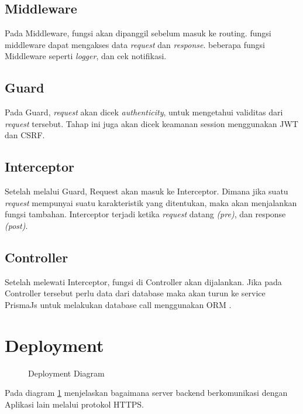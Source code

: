 \subsection{Middleware}
Pada Middleware, fungsi akan dipanggil sebelum masuk ke routing. fungsi middleware dapat mengakses data \textit{request} dan \textit{response}. beberapa fungsi Middleware seperti \textit{logger}, dan cek notifikasi.

\subsection{Guard}
Pada Guard, \textit{request} akan dicek \textit{authenticity}, untuk mengetahui validitas dari \textit{request} tersebut. Tahap ini juga akan dicek keamanan session menggunakan JWT dan CSRF. 

\subsection{Interceptor}
Setelah melalui Guard, Request akan masuk ke Interceptor. Dimana jika suatu \textit{request} mempunyai suatu karakteristik yang ditentukan, maka akan menjalankan fungsi tambahan. Interceptor terjadi ketika \textit{request} datang \textit{(pre)}, dan response \textit{(post)}. 

\subsection{Controller}
Setelah melewati Interceptor, fungsi di Controller akan dijalankan. Jika pada Controller tersebut perlu data dari database maka akan turun ke service PrismaJs untuk melakukan database call menggunakan ORM \cite{NestJS}.
\newpage
\section{Deployment}

\begin{figure}[h]
	{\par}
	\caption{Deployment Diagram}
	\label{deployment}
\end{figure}

Pada diagram \ref{deployment} menjelaskan bagaimana server backend berkomunikasi dengan Aplikasi lain melalui protokol HTTPS. 

